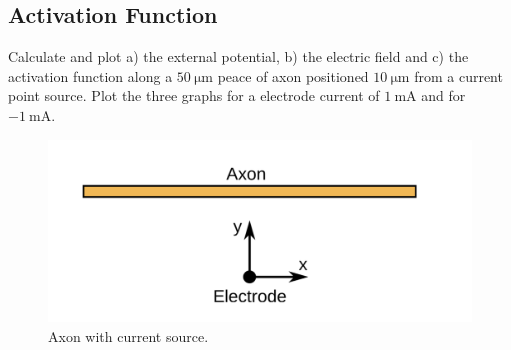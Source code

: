\documentclass{scrartcl}			%
\begin{document}
\subsection{Activation Function}
Calculate and plot a) the external potential, b) the electric field and c) the activation function along a $\SI{50}{\micro\meter}$ peace of axon positioned $\SI{10}{\micro\meter}$ from a current point source. Plot the three graphs for a electrode current of $\SI{1}{\milli\ampere}$ and for $\SI{-1}{\milli\ampere}$.

\begin{figure}[H]
\centering
\includegraphics[width=.5\linewidth]{imgs/axon_img.png}
    \caption{Axon with current source.} 
    \label{fig:axon} 
\end{figure}
\end{document}
